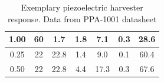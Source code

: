 \documentclass[12pt,a4paper]{article}
\begin{document}
\begin{table}[ht!]
\begin{tabular}{|c|c|c|c|c|c|c|}
1.00                                                                                                 & 60                                                                                     & 1.7                                                                                     & 1.8                                                                                    & 7.1                                                                                     & 0.3                                                                                      & 28.6                                                                 \\ \hline
0.25                                                                                                 & 22                                                                                     & 22.8                                                                                    & 1.4                                                                                    & 9.0                                                                                     & 0.1                                                                                      & 60.4                                                                 \\
0.50                                                                                                 & 22                                                                                     & 22.8                                                                                    & 4.4                                                                                    & 17.3                                                                                    & 0.3                                                                                      & 67.6                                                                 \\ \hline

\end{tabular}
\caption{Exemplary piezoelectric harvester response. Data from PPA-1001 datasheet \cite{PPA}}
\label{tab:ppapower}
\end{table}
\end{document}
